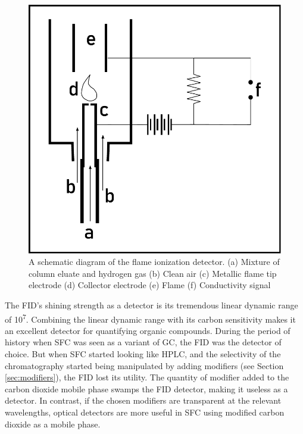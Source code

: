 \begin{figure}
\centering
\includegraphics[width=\textwidth]{Figures/FIDSchematic.pdf}
\decoRule

\caption[FID diagram]{A schematic diagram of the flame ionization detector. (a)
Mixture of column eluate and hydrogen gas (b) Clean air (c) Metallic flame tip
electrode (d) Collector electrode (e) Flame (f) Conductivity signal}

\label{fig:fiddiagram}

\end{figure}

The FID's shining strength as a detector is its tremendous linear dynamic range
of 10\textsuperscript{7}. Combining the linear dynamic range with its carbon
sensitivity makes it an excellent detector for quantifying organic compounds.
During the period of history when SFC was seen as a variant of GC, the FID was
the detector of choice. But when SFC started looking like HPLC, and the
selectivity of the chromatography started being manipulated by adding modifiers
(see Section \ref{sec:modifiers}), the FID lost its utility. The quantity of
modifier added to the carbon dioxide mobile phase swamps the FID detector,
making it useless as a detector. In contrast, if the chosen modifiers are
transparent at the relevant wavelengths, optical detectors are more useful in
SFC using modified carbon dioxide as a mobile phase.

